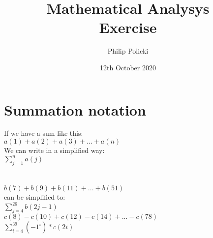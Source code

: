 \documentclass{article}
\title{Mathematical Analysys \\  Exercise }
\author{Philip Policki}
\date{12th October 2020}
\begin{document}
	
	\maketitle 
	\section{Summation notation}
	If we have a sum like this: \\
	$ a(1) + a(2) + a(3) + ... + a(n)$ \\
	We can write in a simplified way: \\ 
	$\sum\limits_{j=1}^{n} a(j) $ \\ \\ \\
	$ b(7) + b(9) + b(11) + ... + b(51) $ \\ 
	can be simplified to: \\
	$ \sum\limits_{j=4}^{26} b(2j -1)$ \\
	$ c(8) - c(10) + c(12) - c(14) + ... - c(78)$ \\ 
	$ \sum\limits_{i=4}^{39} (-1^i) * c(2i) $ \\ 
	
\end{document}
